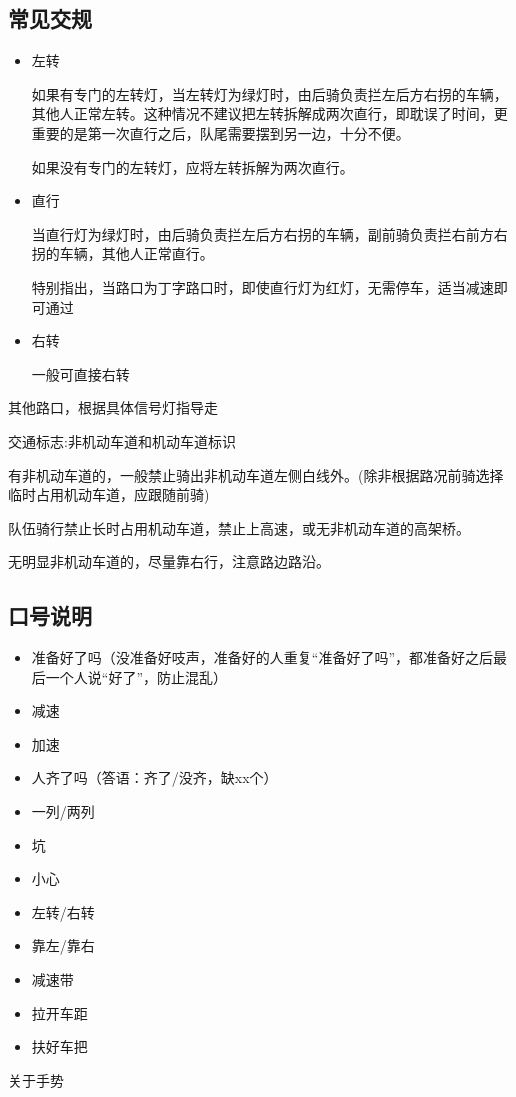 \documentclass{ctexbook}
\begin{document}
\subsection{常见交规}
\begin{itemize}
    \item 左转
    
    如果有专门的左转灯，当左转灯为绿灯时，由后骑负责拦左后方右拐的车辆，其他人正常左转。这种情况不建议把左转拆解成两次直行，即耽误了时间，更重要的是第一次直行之后，队尾需要摆到另一边，十分不便。

    如果没有专门的左转灯，应将左转拆解为两次直行。
    \item 直行
    
    当直行灯为绿灯时，由后骑负责拦左后方右拐的车辆，副前骑负责拦右前方右拐的车辆，其他人正常直行。

    特别指出，当路口为丁字路口时，即使直行灯为红灯，无需停车，适当减速即可通过
    \item 右转
    
    一般可直接右转
\end{itemize}
其他路口，根据具体信号灯指导走
 
交通标志:非机动车道和机动车道标识

有非机动车道的，一般禁止骑出非机动车道左侧白线外。(除非根据路况前骑选择临时占用机动车道，应跟随前骑)

队伍骑行禁止长时占用机动车道，禁止上高速，或无非机动车道的高架桥。

无明显非机动车道的，尽量靠右行，注意路边路沿。
\subsection{口号说明}
\begin{itemize}
\item 准备好了吗（没准备好吱声，准备好的人重复“准备好了吗”，都准备好之后最后一个人说“好了”，防止混乱）
\item 减速
\item 加速
\item 人齐了吗（答语：齐了/没齐，缺xx个）
\item 一列/两列
\item 坑
\item 小心
\item 左转/右转
\item 靠左/靠右
\item 减速带
\item 拉开车距
\item 扶好车把
\end{itemize}
关于手势
\end{document}
